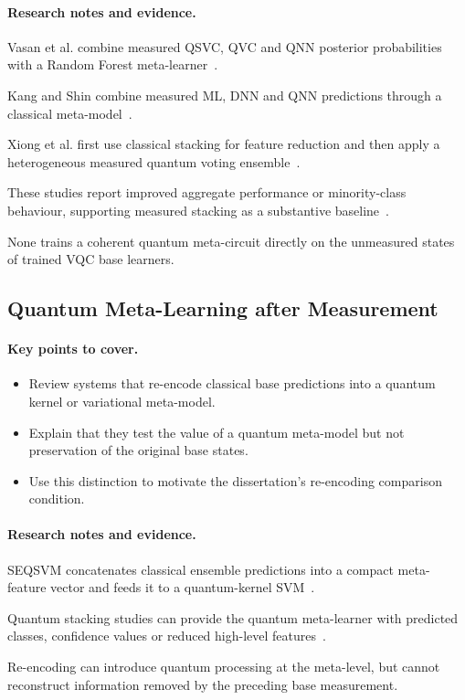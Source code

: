 \documentclass[]{UCD_CS_MSc_AAI_Report}
\newcommand{\method}[1]{{\color{cyan!80!black}#1}}
\newcommand{\result}[1]{{\color{green!60!black}#1}}
\newcommand{\comparison}[1]{{\color{pink!70!violet}#1}}
\newcommand{\gap}[1]{{\color{black}#1}}
\newcommand{\sectionbrief}{\paragraph{Key points to cover.}}
\newcommand{\researchnotes}{\paragraph{Research notes and evidence.}}
\begin{document}
\researchnotes
\begin{itemize}
    \method{\item Vasan et al. combine measured QSVC, QVC and QNN posterior probabilities with a Random Forest meta-learner~\cite{vasan_exploring_2025}.}
    \method{\item Kang and Shin combine measured ML, DNN and QNN predictions through a classical meta-model~\cite{kang_amino_2025}.}
    \method{\item Xiong et al. first use classical stacking for feature reduction and then apply a heterogeneous measured quantum voting ensemble~\cite{xiong_hybrid_2024}.}
    \result{\item These studies report improved aggregate performance or minority-class behaviour, supporting measured stacking as a substantive baseline~\cite{vasan_exploring_2025,kang_amino_2025,xiong_hybrid_2024}.}
    \gap{\item None trains a coherent quantum meta-circuit directly on the unmeasured states of trained VQC base learners.}
\end{itemize}

\subsection{Quantum Meta-Learning after Measurement}

\sectionbrief
\begin{itemize}
    \item Review systems that re-encode classical base predictions into a quantum kernel or variational meta-model.
    \item Explain that they test the value of a quantum meta-model but not preservation of the original base states.
    \item Use this distinction to motivate the dissertation's re-encoding comparison condition.
\end{itemize}

\researchnotes
\begin{itemize}
    \method{\item SEQSVM concatenates classical ensemble predictions into a compact meta-feature vector and feeds it to a quantum-kernel SVM~\cite{akrom_bloodbrain_2025}.}
    \method{\item Quantum stacking studies can provide the quantum meta-learner with predicted classes, confidence values or reduced high-level features~\cite{tolotti_ensembles_2024,akrom_bloodbrain_2025}.}
    \comparison{\item Re-encoding can introduce quantum processing at the meta-level, but cannot reconstruct information removed by the preceding base measurement.}
\end{itemize}
\end{document}
